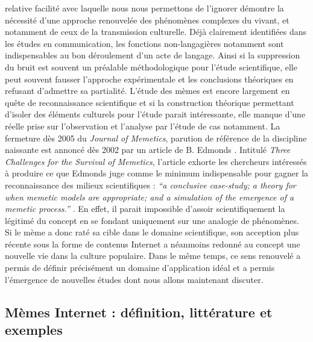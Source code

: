 relative facilit\'e avec laquelle nous nous permettons de l{\textquoteright}ignorer d\'emontre la n\'ecessit\'e d{\textquoteright}une approche renouvel\'ee des ph\'enom\`enes complexes du vivant, et notamment de ceux de la transmission culturelle. D\'ej\`a clairement identifi\'ees dans les \'etudes en communication, les fonctions non-langagi\`eres notamment sont indispensables au bon d\'eroulement d{\textquoteright}un acte de langage. Ainsi si la suppression du bruit est souvent un pr\'ealable m\'ethodologique pour l{\textquoteright}\'etude scientifique, elle peut souvent fausser l{\textquoteright}approche exp\'erimentale et les conclusions th\'eoriques en refusant d{\textquoteright}admettre sa partialit\'e. L{\textquoteright}\'etude des m\`emes est encore largement en qu\^ete de reconnaissance scientifique et si la construction th\'eorique permettant d{\textquoteright}isoler des \'el\'ements culturels pour l{\textquoteright}\'etude parait int\'eressante, elle manque d{\textquoteright}une r\'eelle prise sur l{\textquoteright}observation et l{\textquoteright}analyse par l{\textquoteright}\'etude de cas notamment. La fermeture d\`es 2005 du \textit{Journal of Memetics}, parution de r\'ef\'erence de la discipline naissante est annonc\'e d\`es 2002 par un article de B. Edmonds \citep{Jouxtel2014}. Intitul\'e \textit{Three Challenges for the Survival of Memetics}, l{\textquoteright}article\textit{ }exhorte les chercheurs int\'eress\'es \`a produire ce que Edmonds juge comme le minimum indispensable pour gagner la reconnaissance des milieux scientifiques : \textit{{\textquotedblleft}a conclusive case-study; a theory for when memetic models are appropriate; and a simulation of the emergence of a memetic process.{\textquotedblright}} \citep{Edmonds2002}.  
En effet, il parait impossible d{\textquoteright}assoir scientifiquement la l\'egitim\'e du concept en se fondant uniquement sur une analogie de ph\'enom\`enes. Si le m\`eme a donc rat\'e sa cible dans le domaine scientifique, son acception plus r\'ecente sous la forme de contenus Internet a n\'eanmoins redonn\'e au concept une nouvelle vie dans la culture populaire. Dans le m\^eme temps, ce sens renouvel\'e a permis de d\'efinir pr\'ecis\'ement un domaine d{\textquoteright}application id\'eal et a permis l{\textquoteright}\'emergence de nouvelles \'etudes dont nous allons maintenant discuter. 

\subsection[ M\`emes Internet : d\'efinition, litt\'erature et exemples]{M\`emes Internet : d\'efinition, litt\'erature et exemples}

